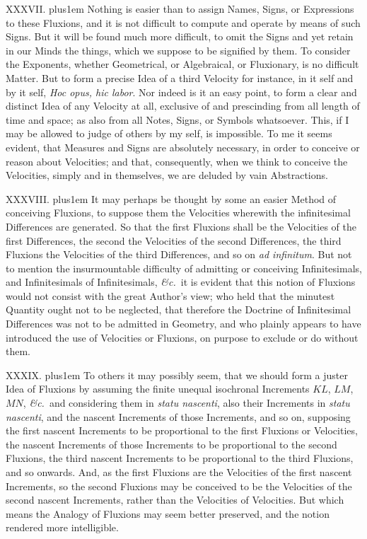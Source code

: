 \medbreak

XXXVII. \hskip 0pt plus1em
Nothing is easier than to assign Names, Signs, or Expressions to
these Fluxions, and it is not difficult to compute and operate by
means of such Signs.  But it will be found much more difficult,
to omit the Signs and yet retain in our Minds the things, which
we suppose to be signified by them.  To consider the Exponents,
whether Geometrical, or Algebraical, or Fluxionary, is no
difficult Matter.  But to form a precise Idea of a third Velocity
for instance, in it self and by it self, {\it Hoc opus, hic
labor}.  Nor indeed is it an easy point, to form a clear and
distinct Idea of any Velocity at all, exclusive of and
prescinding from all length of time and space; as also from all
Notes, Signs, or Symbols whatsoever.  This, if I may be allowed
to judge of others by my self, is impossible.  To me it seems
evident, that Measures and Signs are absolutely necessary, in
order to conceive or reason about Velocities; and that,
consequently, when we think to conceive the Velocities, simply
and in themselves, we are deluded by vain Abstractions.

\medbreak

XXXVIII. \hskip 0pt plus1em
It may perhaps be thought by some an easier Method of conceiving
Fluxions, to suppose them the Velocities wherewith the
infinitesimal Differences are generated.  So that the first
Fluxions shall be the Velocities of the first Differences, the
second the Velocities of the second Differences, the third
Fluxions the Velocities of the third Differences, and so on
{\it ad infinitum}.  But not to mention the insurmountable
difficulty of admitting or conceiving Infinitesimals, and
Infinitesimals of Infinitesimals, {\it \&c.}\ it is evident that
this notion of Fluxions would not consist with the great Author's
view; who held that the minutest Quantity ought not to be
neglected, that therefore the Doctrine of Infinitesimal
Differences was not to be admitted in Geometry, and who plainly
appears to have introduced the use of Velocities or Fluxions, on
purpose to exclude or do without them.

\medbreak

XXXIX. \hskip 0pt plus1em
To others it may possibly seem, that we should form a juster Idea
of Fluxions by assuming the finite unequal isochronal Increments
$KL$, $LM$, $MN$, {\it \&c.}\ and considering them in {\it statu
nascenti}, also their Increments in {\it statu nascenti}, and the
nascent Increments of those Increments, and so on, supposing the
first nascent Increments to be proportional to the first Fluxions
or Velocities, the nascent Increments of those Increments to be
proportional to the second Fluxions, the third nascent Increments
to be proportional to the third Fluxions, and so onwards.  And,
as the first Fluxions are the Velocities of the first nascent
Increments, so the second Fluxions may be conceived to be the
Velocities of the second nascent Increments, rather than the
Velocities of Velocities.  But which means the Analogy of
Fluxions may seem better preserved, and the notion rendered more
intelligible.

